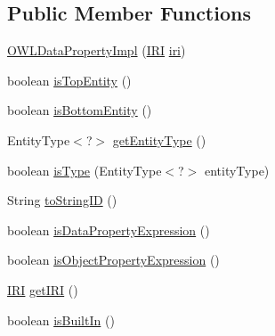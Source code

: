 \subsection*{Public Member Functions}
\begin{DoxyCompactItemize}
\item 
\hyperlink{classuk_1_1ac_1_1manchester_1_1cs_1_1owl_1_1owlapi_1_1_o_w_l_data_property_impl_a2d6de56d0e11a4fc5f35b267c8ce4cce}{O\-W\-L\-Data\-Property\-Impl} (\hyperlink{classorg_1_1semanticweb_1_1owlapi_1_1model_1_1_i_r_i}{I\-R\-I} \hyperlink{classuk_1_1ac_1_1manchester_1_1cs_1_1owl_1_1owlapi_1_1_o_w_l_data_property_impl_aac4bb129053e0f09d194836a8e0caa0c}{iri})
\item 
boolean \hyperlink{classuk_1_1ac_1_1manchester_1_1cs_1_1owl_1_1owlapi_1_1_o_w_l_data_property_impl_a25952b47814e10c6d15ecde58bc24c9d}{is\-Top\-Entity} ()
\item 
boolean \hyperlink{classuk_1_1ac_1_1manchester_1_1cs_1_1owl_1_1owlapi_1_1_o_w_l_data_property_impl_a401a7d834b6dda9c1175fafa11e4b58b}{is\-Bottom\-Entity} ()
\item 
Entity\-Type$<$?$>$ \hyperlink{classuk_1_1ac_1_1manchester_1_1cs_1_1owl_1_1owlapi_1_1_o_w_l_data_property_impl_ab71bb4d0a6ba0c49dc90bbd83f49fba5}{get\-Entity\-Type} ()
\item 
boolean \hyperlink{classuk_1_1ac_1_1manchester_1_1cs_1_1owl_1_1owlapi_1_1_o_w_l_data_property_impl_a86b448a465dd7b5eb75d15f420c24cda}{is\-Type} (Entity\-Type$<$?$>$ entity\-Type)
\item 
String \hyperlink{classuk_1_1ac_1_1manchester_1_1cs_1_1owl_1_1owlapi_1_1_o_w_l_data_property_impl_a373c683a464d229db783adac7e0cd445}{to\-String\-I\-D} ()
\item 
boolean \hyperlink{classuk_1_1ac_1_1manchester_1_1cs_1_1owl_1_1owlapi_1_1_o_w_l_data_property_impl_a94533c191bd62a8dfdf23395e72065e9}{is\-Data\-Property\-Expression} ()
\item 
boolean \hyperlink{classuk_1_1ac_1_1manchester_1_1cs_1_1owl_1_1owlapi_1_1_o_w_l_data_property_impl_ae081c779838baa3818e31da8f59af5ee}{is\-Object\-Property\-Expression} ()
\item 
\hyperlink{classorg_1_1semanticweb_1_1owlapi_1_1model_1_1_i_r_i}{I\-R\-I} \hyperlink{classuk_1_1ac_1_1manchester_1_1cs_1_1owl_1_1owlapi_1_1_o_w_l_data_property_impl_a7ffd5730675d986ca3958f9810866cd9}{get\-I\-R\-I} ()
\item 
boolean \hyperlink{classuk_1_1ac_1_1manchester_1_1cs_1_1owl_1_1owlapi_1_1_o_w_l_data_property_impl_a3f5e776e8e961a39d0116dd212503f03}{is\-Built\-In} ()

\end{DoxyCompactItemize}
